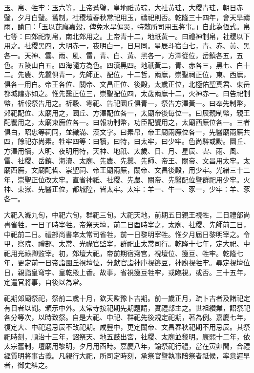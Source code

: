 \begin{pinyinscope}
玉、帛、牲牢：玉六等，上帝蒼璧，皇地祇黃琮，大社黃珪，大稷青珪，朝日赤璧，夕月白璧。舊制，社稷壇春秋常祀用玉，禱祀則否。乾隆三十四年，會天旱禱雨，諭曰：「玉以芘廕嘉穀，俾免水旱偏災，特敕所司用玉將事。」自此為恆式。帛七等：曰郊祀制帛，南北郊用之。上帝青十二，地祇黃一。曰禮神制帛，社稷以下用之。社稷黑四，大明赤一，夜明白一，日月同。星辰斗宿白七，青、赤、黃、黑各一。天神、雲、雨、風、雷，青、白、黃、黑各一，方澤從位，岳鎮各五，五色。五陵山白五。四海隨方為色。四瀆黑四。地祇黃二，青、赤各三，黑七、白十二。先農、先蠶俱青一，先師正、配位，十二哲，兩廡，崇聖祠正位，東、西廡，俱各一用白。帝王各位、關帝、文昌正位、後殿，太歲正位，北極佑聖真君、東岳都城隍亦如之。惟先醫正位三，崇聖配位四，太歲兩廡十二，火神赤一。曰告祀制幣，祈報祭告用之。祈穀、雩祀、告祀圜丘俱青一，祭告方澤黃一。曰奉先制幣，郊祀配位、太廟用之，圜丘、方澤配位各一，太廟帝後每位一。曰展親制幣，親王配饗用之，太廟東廡位各一。曰報功制幣，功臣配饗用之，太廟西廡位各一。三者俱白，昭忠等祠同，並織滿、漢文字。曰素帛，帝王廟兩廡位各一，先醫廟兩廡共四，餘祀亦尚素。牲牢四等：曰犢，曰特，曰太牢，曰少牢。色尚騂或黝。圜丘、方澤用犢，大明、夜明用特，天神、地祇、太歲、日、月、星辰、雲、雨、風、雷、社稷、岳鎮、海瀆、太廟、先農、先蠶、先師、帝王、關帝、文昌用太牢。太廟西廡，文廟配哲、崇聖祠、帝王廟兩廡，關帝、文昌後殿，用少牢。光緒三十二年，崇聖正位改太牢。直省神祇、社稷、先農、關帝、先醫配位暨群祀用少牢。火神、東嶽、先醫正位，都城隍，皆太牢。太牢：羊一、牛一、豕一，少牢：羊、豕各一。

大祀入滌九旬，中祀六旬，群祀三旬。大祀天地，前期五日親王視牲，二日禮部尚書省牲，一日子時宰牲。帝祭天壇，前二日酉時宰之，太廟、社稷、先師前三日，中祀前二日。禮部尚書率太常司省牲，前一日黎明宰牲。惟夕月屆日黎明宰之。令甲，察院、禮部、太常、光祿官監宰，群祀止太常司行。乾隆十七年，定大祀、中祀用光祿卿監宰。初，郊壇大祀，帝前期宿齋宮，視壇位、籩豆、牲牢。乾隆七年，更定前一日帝詣圜丘視壇位，分獻官詣神庫視籩豆，神廚視牲牢。尋定視壇位日，親詣皇穹宇、皇乾殿上香。故事，省視籩豆牲牢，或臨視，或否。三十五年，定遣官將事，自後以為常。

祀期郊廟祭祀，祭前二歲十月，欽天監豫卜吉期。前一歲正月，疏卜吉者及諸祀定有日者以聞。頒示中外。太常寺按祀期先期題請，實禮部主之。世祖纘業，詔祭祀各分等次，以時致祭。自是大祀、中祀、群祀先後規定祀期，著為例。嘉慶七年，復定大、中祀遇忌辰不改祀期。咸豐中，更定關帝、文昌春秋祀期不用忌辰。其祭祀時刻，順治十三年，詔祭天、地五鼓出宮，社稷、太廟並黎明。康熙十二年，依太宗舊制，壇廟用黎明，夕月用酉時。嘉慶八年，諭祭祀行禮，當在寅卯間，合禮經質明將事古義。凡親行大祀，所司定時刻，承祭官暨執事陪祭者祗候，率意遲早者，御史糾之。


\end{pinyinscope}

